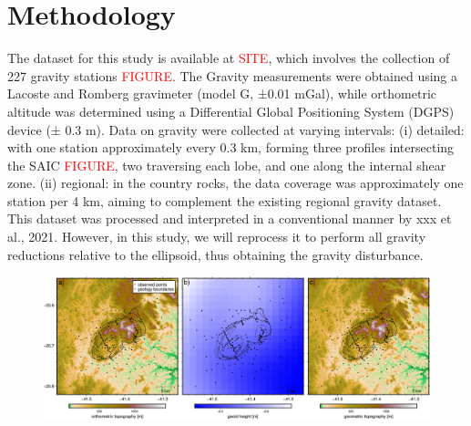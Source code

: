 \section{Methodology}

The dataset for this study is available at \textcolor{red}{SITE}, which involves the collection of 227 gravity stations \textcolor{red}{FIGURE}. The Gravity measurements were obtained using a Lacoste and Romberg gravimeter (model G, ±0.01 mGal), while orthometric altitude was determined using a Differential Global Positioning System (DGPS) device (± 0.3 m). Data on gravity were collected at varying intervals: (i) detailed: with one station approximately every 0.3 km, forming three profiles intersecting the SAIC \textcolor{red}{FIGURE}, two traversing each lobe, and one along the internal shear zone. (ii) regional: in the country rocks, the data coverage was approximately one station per 4 km, aiming to complement the existing regional gravity dataset. This dataset was processed and interpreted in a conventional manner by xxx et al., 2021. However, in this study, we will reprocess it to perform all gravity reductions relative to the ellipsoid, thus obtaining the gravity disturbance.






\begin{figure}[tb!]
  \centering
  \includegraphics[width=1\linewidth]{figures/heights.png}
  \caption{
      }
  \label{euler1}
\end{figure}
